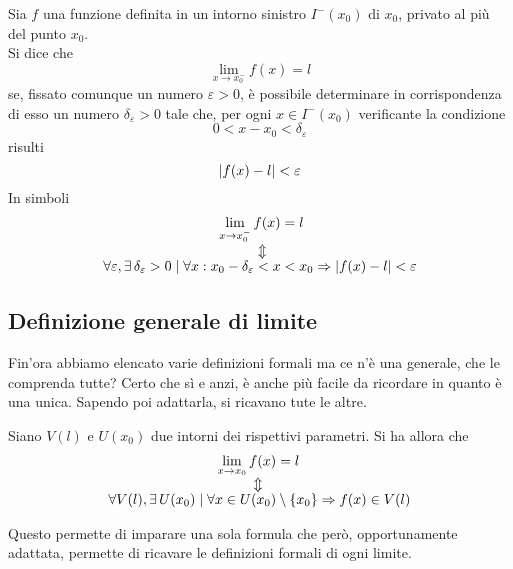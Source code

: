 \begin{definizioneLimiteFinitoSinistro}
  Sia $f$ una funzione definita in un intorno sinistro $I^-(x_0)$ di $x_0$, privato al più del punto
  $x_0$.\\
  Si dice che
  \begin{equation*}
    \lim\limits_{x\to x_0^-}f(x) = l
  \end{equation*}
  se, fissato comunque un numero $\varepsilon>0$, è possibile determinare in corrispondenza di esso
  un numero $\delta_\varepsilon>0$ tale che, per ogni $x\in I^-(x_0)$ verificante la condizione
  \begin{equation*}
    0<x-x_0<\delta_\varepsilon
  \end{equation*}
  risulti
  \begin{equation*}
    \lvert f(x)-l\rvert<\varepsilon
  \end{equation*}
  In simboli
  \begin{align*}
    \lim\limits_{x\to x_0^-} f(x) &= l\\
    \ArrowBetweenLines
    \forall \varepsilon, \exists\,\delta_\varepsilon>0\mid\forall x: x_0-\delta_\varepsilon<x&<x_0
    \Rightarrow \vert f(x) - l\vert < \varepsilon
  \end{align*}
\end{definizioneLimiteFinitoSinistro}

\subsection{Definizione generale di limite}
Fin'ora abbiamo elencato varie definizioni formali ma ce n'è una generale, che le comprenda tutte? 
Certo che sì e anzi, è anche più facile da ricordare in quanto è una unica. Sapendo poi adattarla, si
ricavano tute le altre.
\begin{definizioneGeneraleLimite}
  Siano $V(l)$ e $U(x_0)$ due intorni dei rispettivi parametri. Si ha allora che
  \begin{align*}
    \lim\limits_{x\to x_0} f(x) &= l\\
    \ArrowBetweenLines
    \forall V(l), \exists\,U(x_0)\mid\forall x\in U(x_0)&\setminus\{x_0\}\Rightarrow f(x)\in V(l)
  \end{align*}
\end{definizioneGeneraleLimite}
Questo permette di imparare una sola formula che però, opportunamente adattata, permette di ricavare
le definizioni formali di ogni limite.

